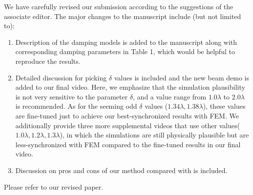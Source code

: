We have carefully revised our submission according to the suggestions of the associate editor. The major changes to the manuscript include (but not limited to):
\begin{enumerate}
\item{Description of the damping models is added to the manuscript along with corresponding damping parameters in Table 1, which would be helpful to reproduce the results.}

\item{Detailed discussion for picking $\delta$ values is included and the new beam demo is added to our final video.
      Here, we emphasize that the simulation plausibility is not very
      sensitive to the parameter $\delta$, and a value range from $1.0\lambda$ to $2.0\lambda$ is recommended.
      As for the seeming odd $\delta$ values ($1.34\lambda, 1.38\lambda$), these values are fine-tuned just to achieve our best-synchronized results with FEM. We additionally provide three more supplemental videos that use other values($1.0\lambda,1.2\lambda,1.3\lambda$), in which the simulations are still physically plausible but are less-synchronized with FEM compared to the fine-tuned results in our final video.}

\item{Discussion on pros and cons of our method compared with \cite{Pauly:2005:MAF:1073204.1073296} is included.}
\end{enumerate}

Please refer to our revised paper.

%





